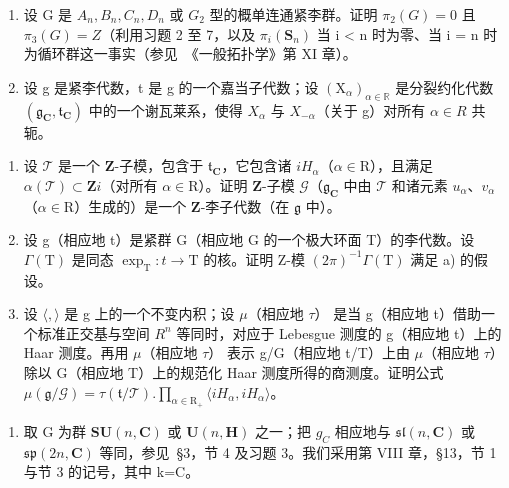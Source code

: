 \begin{enumerate}
\def\labelenumi{\arabic{enumi})}
\setcounter{enumi}{7}
\item
  设 G 是 \(A_{n}, B_{n}, C_{n}, D_{n}\) 或 \(G_{2}\) 型的概单连通紧李群。证明 \(\pi_{2}(G) = 0\) 且 \(\pi_{3}(G) = Z\)（利用习题 2 至 7，以及 \(\pi_{i}(\mathbf{S}_{n})\) 当 i \textless{} n 时为零、当 i = n 时为循环群这一事实（参见~《一般拓扑学》第 XI 章）。
\item
  设 g 是紧李代数，t 是 g 的一个嘉当子代数；设 \((\mathrm{X}_{\alpha})_{\alpha\in\mathbb{R}}\) 是分裂约化代数 \((\mathfrak{g}_{\mathbf{C}},\mathfrak{t}_{\mathbf{C}})\) 中的一个谢瓦莱系，使得 \(X_{\alpha}\) 与 \(X_{-\alpha}\)（关于 g）对所有 \(\alpha\in R\) 共轭。
\end{enumerate}

\begin{enumerate}
\def\labelenumi{\alph{enumi})}
\item
  设 \(\mathcal{T}\) 是一个 \(\mathbf{Z}\)-子模，包含于 \(\mathfrak{t}_{\mathbf{C}}\)，它包含诸 \(iH_{\alpha}\)（\(\alpha \in \mathrm{R}\)），且满足 \(\alpha(\mathcal{T}) \subset \mathbf{Z}i\)（对所有 \(\alpha \in \mathrm{R}\)）。证明 \(\mathbf{Z}\)-子模 \(\mathcal{G}\)（\(\mathfrak{g}_{\mathbf{C}}\) 中由 \(\mathcal{T}\) 和诸元素 \(u_{\alpha}\)、\(v_{\alpha}\)（\(\alpha \in \mathrm{R}\)）生成的）是一个 \(\mathbf{Z}\)-李子代数（在 \(\mathfrak{g}\) 中）。
\item
  设 g（相应地 t）是紧群 G（相应地 G 的一个极大环面 T）的李代数。设 \(\Gamma(\mathrm{T})\) 是同态 \(\exp_{\mathrm{T}}:t\to\mathrm{T}\) 的核。证明 Z-模 \((2\pi)^{-1}\varGamma(\mathrm{T})\) 满足 a) 的假设。
\item
  设 \(\langle,\rangle\) 是 g 上的一个不变内积；设 \(\mu\)（相应地 \(\tau\)） 是当 g（相应地 t）借助一个标准正交基与空间 \(R^{n}\) 等同时，对应于 Lebesgue 测度的 g（相应地 t）上的 Haar 测度。再用 \(\mu\)（相应地 \(\tau\)） 表示 g/G（相应地 t/T）上由 \(\mu\)（相应地 \(\tau\)） 除以 G（相应地 T）上的规范化 Haar 测度所得的商测度。证明公式 \(\mu(\mathfrak{g}/\mathcal{G})=\tau(\mathfrak{t}/\mathcal{T}).\prod_{\alpha\in\mathrm{R}_{+}}\langle iH_{\alpha},iH_{\alpha}\rangle\)。
\end{enumerate}


\begin{enumerate}
\def\labelenumi{\arabic{enumi})}
\tightlist
\item
  取 G 为群 \(\mathbf{SU}(n,\mathbf{C})\) 或 \(\mathbf{U}(n,\mathbf{H})\) 之一；把 \(g_{C}\) 相应地与 \(\mathfrak{sl}(n,\mathbf{C})\) 或 \(\mathfrak{sp}(2n,\mathbf{C})\) 等同，参见~§3，节 4 及习题 3。我们采用第 VIII 章，§13，节 1 与节 3 的记号，其中 k=C。
\end{enumerate}

